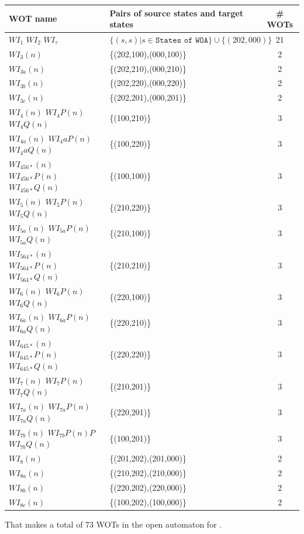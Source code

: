 \documentclass{elsarticle}
\begin{document}
\noindent\begin{tabular}{|@{\,}l@{\,}|@{\,}l@{\,}|@{\,}c@{\,}|}
\hline
    WOT name & Pairs of source states and target states & \# WOTs \\
    \hline
    $WI_1$ $WI_2$ $WI_\tau$ & $\{(s,s)| s \!\in\! \texttt{States of WOA}\} \!\cup\! \{(202,000)\} $ & 21 \\
    $WI_3(n)$ & \{(202,100),(000,100)\} & 2 \\
    $WI_{3a}(n)$ & \{(202,210),(000,210)\} & 2 \\
    $WI_{3b}(n)$ & \{(202,220),(000,220)\} & 2 \\
    $WI_{3c}(n)$ & \{(202,201),(000,201)\} & 2 \\
    $WI_4(n)$ $WI_4P(n)$ $WI_4Q(n)$ & \{(100,210)\} & 3 \\
    $WI_{4a}(n)$ $WI_4aP(n)$ $WI_4aQ(n)$ & \{(100,220)\} & 3 \\
    $WI_{456*}(n) $ $WI_{456*}P(n) $ $WI_{456*}Q(n) $ & \{(100,100)\} & 3 \\
    $WI_5(n)$ $WI_5P(n)$ $WI_5Q(n)$ & \{(210,220)\} & 3 \\
    $WI_{5a}(n)$ $WI_{5a}P(n)$ $WI_{5a}Q(n)$ & \{(210,100)\} & 3 \\
    $WI_{564*}(n) $ $WI_{564*}P(n) $ $WI_{564*}Q(n) $ & \{(210,210)\} & 3 \\
    $WI_6(n)$ $WI_6P(n)$ $WI_6Q(n)$ & \{(220,100)\} & 3 \\
    $WI_{6a}(n)$ $WI_{6a}P(n)$ $WI_{6a}Q(n)$ & \{(220,210)\} & 3 \\
    $WI_{645*}(n) $ $WI_{645*}P(n) $ $WI_{645*}Q(n) $ & \{(220,220)\} & 3 \\
    $WI_7(n)$ $WI_7P(n)$ $WI_7Q(n)$ & \{(210,201)\} & 3 \\
    $WI_{7a}(n)$ $WI_{7a}P(n)$ $WI_{7a}Q(n)$ & \{(220,201)\} & 3 \\
    $WI_{7b}(n)$ $WI_{7b}P(n)P$ $WI_{7b}Q(n)$ & \{(100,201)\} & 3 \\
    $WI_8(n)$ & \{(201,202),(201,000)\} & 2\\ 
    $WI_{8a}(n)$ & \{(210,202),(210,000)\} & 2 \\
    $WI_{8b}(n)$ & \{(220,202),(220,000)\} & 2 \\
    $WI_{8c}(n)$ & \{(100,202),(100,000)\} & 2 \\
   
    \hline
    \end{tabular}

    \bigskip
    That makes a total of 73 WOTs  in the open automaton for .
\end{document}
